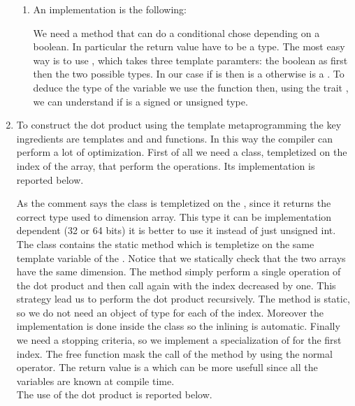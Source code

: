 \begin{enumerate}
\begin{enumerate}
        \item An implementation is the following:
        \lstset{basicstyle=\scriptsize\sf}
        
        \lstset{basicstyle=\sf}
        We need a method that can do a conditional chose depending on a boolean.
        In particular the return value have to be a type. The most easy way is to
        use , which takes three template paramters: the
        boolean as first then the two possible types. In our case if 
        is  then  is a  otherwise is a .
        To deduce the type of the variable  we use the function
         then, using the trait , we can understand
        if  is a signed or unsigned type.

    \end{enumerate}

    \item To construct the dot product using the template metaprogramming the key
    ingredients are templates and  and  functions. In this way the
    compiler can perform a lot of optimization. First of all we need a class,
    templetized on the index of the array, that perform the operations.
    Its implementation is reported below.
    \lstset{basicstyle=\scriptsize\sf}
    
    \lstset{basicstyle=\sf}
    As the comment says the class is templetized on the , since it
    returns the correct type used to dimension array. This type it can be
    implementation dependent (32 or 64 bits) it is better to use it instead of just
    unsigned int. The class  contains the static method 
    which is templetize on the same template variable of the .
    Notice that we statically check that the two arrays have the same dimension. The
    method simply perform a single operation of the dot product and then call again
     with the index decreased by one. This strategy lead us to perform
    the dot product recursively. The method is static, so we do not need an object
    of type  for each of the index.  Moreover the implementation is
    done inside the class so the inlining is automatic.  Finally we need a stopping
    criteria, so we implement a specialization of  for the first index.
    The free function  mask the call of the method  by
    using the normal \cpp{*} operator. The return value is a  which
    can be more usefull since all the variables are known at compile time.\\
    The use of the dot product is reported below.
    \lstset{basicstyle=\scriptsize\sf}
    
    \lstset{basicstyle=\sf}

\end{enumerate}

